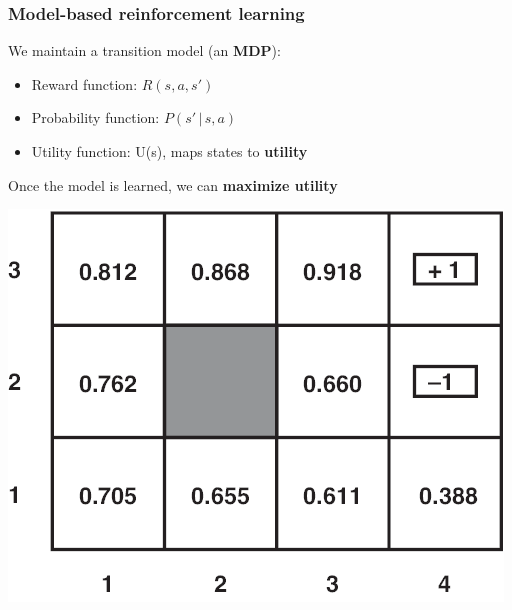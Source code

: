 \documentclass{beamer}
\begin{document}
\begin{frame}
	\frametitle{Model-based reinforcement learning}
	We maintain a transition model (an \textbf{MDP}):
	\begin{itemize}
		\item Reward function: $R(s, a, s')$
		\item Probability function: $P(s' \, | \, s, a)$
		\item Utility function: U(s), maps states to \textbf{utility}
	\end{itemize}
	\pause
	Once the model is learned, we can \textbf{maximize utility}
	\begin{center}
		\includegraphics[scale=0.8]{figures/optimal-policy-values.png}
	\end{center}
\end{frame}
\end{document}
